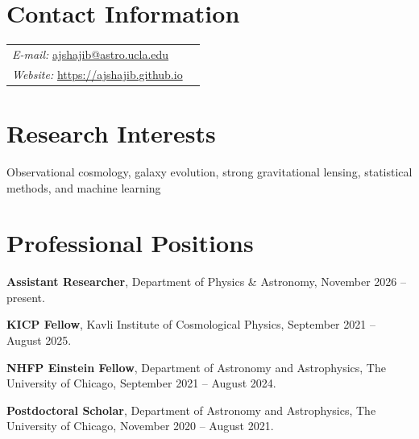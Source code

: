 \documentclass[margin, line]{res}
\newenvironment{list1}{
  \begin{list}{\ding{113}}{%
      \setlength{\itemsep}{0in}
      \setlength{\parsep}{0in} \setlength{\parskip}{0in}
      \setlength{\topsep}{0in} \setlength{\partopsep}{0in} 
      \setlength{\leftmargin}{0.17in}}}{\end{list}}
\begin{document}

\begin{resume}


\section{\sc Contact Information}
\vspace{.05in}
\begin{tabular}{@{}p{3in}p{3in}}  
{\it E-mail:}  \href{mailto:ajshajib@gmail.com}{ajshajib@astro.ucla.edu} & \\
{\it Website:} \url{https://ajshajib.github.io} &
                 
\end{tabular}


\section{\sc Research Interests}
Observational cosmology, galaxy evolution, strong gravitational lensing,  statistical methods, and machine learning

\vspace*{2.5mm}
\section{\sc Professional Positions}

\vspace*{.16in}
\begin{list1}
	\item[] \textbf{Assistant Researcher}, Department of Physics \& Astronomy, November 2026 -- present.
	\item[] \textbf{KICP Fellow}, Kavli Institute of Cosmological Physics, September 2021 -- August 2025.
	\item[] \textbf{NHFP Einstein Fellow}, Department of Astronomy and Astrophysics, The University of Chicago, September 2021 -- August 2024.
	\item[] \textbf{Postdoctoral Scholar}, Department of Astronomy and Astrophysics, The University of Chicago, November 2020 -- August 2021.
\end{list1}


\end{resume}
\end{document}
